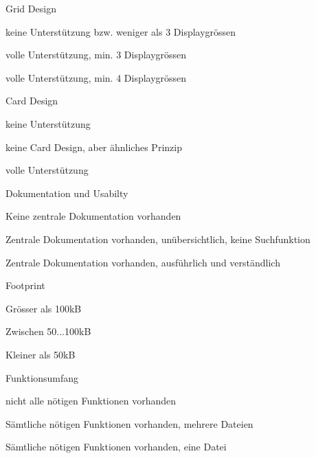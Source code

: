 \begin{itemize*}
\item Grid Design
  \begin{enumerate*}
  \item keine Unterstützung bzw. weniger als 3 Displaygrössen
  \item volle Unterstützung, min. 3 Displaygrössen
  \item volle Unterstützung, min. 4 Displaygrössen
  \end{enumerate*}
\item Card Design
  \begin{enumerate*}
  \item keine Unterstützung
  \item keine Card Design, aber ähnliches Prinzip
  \item volle Unterstützung
  \end{enumerate*}
\item Dokumentation und Usabilty
  \begin{enumerate*}
  \item Keine zentrale Dokumentation vorhanden
  \item Zentrale Dokumentation vorhanden, unübersichtlich, keine Suchfunktion
  \item Zentrale Dokumentation vorhanden, ausführlich und verständlich
  \end{enumerate*}
\item Footprint
  \begin{enumerate*}
  \item Grösser als 100kB
  \item Zwischen 50...100kB
  \item Kleiner als 50kB
  \end{enumerate*}
\item Funktionsumfang
  \begin{enumerate*}
  \item nicht alle nötigen Funktionen vorhanden
  \item Sämtliche nötigen Funktionen vorhanden, mehrere Dateien
  \item Sämtliche nötigen Funktionen vorhanden, eine Datei
  \end{enumerate*}
\end{itemize*}

